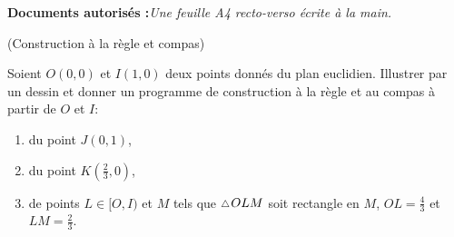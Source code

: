 \documentclass[a4paper,12pt,reqno]{amsart}
\begin{document}
\ifsolutions\else
\textbf{Documents autorisés :}\textit{Une feuille A4 recto-verso écrite à la main.}

\vspace{7mm}
\tsvp
\fi

\begin{exo} (Construction à la règle et compas)

  Soient $O(0,0)$ et $I(1,0)$ deux points donnés du plan euclidien. Illustrer par un dessin et donner un programme de construction à la règle et au compas à partir de $O$ et $I$:
  \begin{enumerate}
    \item du point $J(0,1)$,
    \item du point $K(\frac23,0)$,
    \item de points $L \in [O,I)$ et $M$ tels que $\tri OLM$ soit rectangle en $M$, $OL=\frac43$ et $LM=\frac23$.
  \end{enumerate}
\end{exo}
\end{document}
